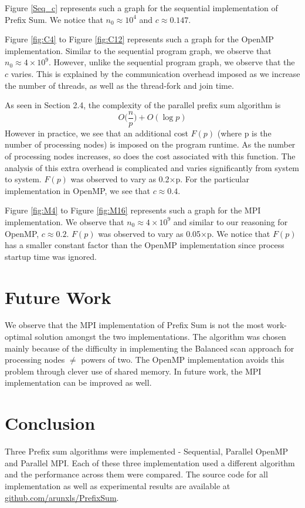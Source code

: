 \documentclass[11pt]{article}
\begin{document}
Figure \ref{Seq_c} represents such a graph for the sequential implementation of Prefix Sum. We notice that $n_{0} \approx 10^{4}$ and $c \approx 0.147$.

Figure \ref{fig:C4} to Figure \ref{fig:C12} represents such a graph for the OpenMP implementation. Similar to the sequential program graph, we observe that $n_{0} \approx 4\times10^{9}$. However, unlike the sequential program graph, we observe that the $c$ varies. This is explained by the communication overhead imposed as we increase the number of threads, as well as the thread-fork and join time. 

As seen in Section 2.4, the complexity of the parallel prefix sum algorithm is 
\[O\bigg(\frac{n}{p}\bigg) + O(\log p)\]However in practice, we see that an additional cost $F(p)$ (where p is the number of processing nodes) is imposed on the program runtime. As the number of processing nodes increases, so does the cost associated with this function. The analysis of this extra overhead is complicated and varies significantly from system to system. $F(p)$ was observed to vary as 0.2$\times$p. For the particular implementation in OpenMP, we see that $c \approx 0.4$.

Figure \ref{fig:M4} to Figure \ref{fig:M16} represents such a graph for the MPI implementation. We observe that $n_{0} \approx 4\times10^{9}$ and similar to our reasoning for OpenMP, $c \approx 0.2$. $F(p)$ was observed to vary as 0.05$\times$p. We notice that $F(p)$ has a smaller constant factor than the OpenMP implementation since process startup time was ignored.

\section{Future Work}
We observe that the MPI implementation of Prefix Sum is not the most work-optimal solution amongst the two implementations. The algorithm was chosen mainly because of the difficulty in implementing the Balanced scan approach for processing nodes $\neq$ powers of two. The OpenMP implementation avoids this problem through clever use of shared memory. In future work, the MPI implementation can be improved as well.


\section{Conclusion}
Three Prefix sum algorithms were implemented - Sequential, Parallel OpenMP and Parallel MPI. Each of these three implementation used a different algorithm and the performance across them were compared. The source code for all implementation as well as experimental results are available at \href{https://github.com/arunxls/PrefixSum}{github.com/arunxls/PrefixSum}.
\end{document}
